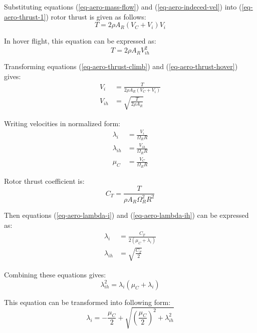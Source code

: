 Substituting equations (\ref{eq-aero-mass-flow}) and (\ref{eq-aero-indeced-vel}) into (\ref{eq-aero-thrust-1}) rotor thrust is given as follows:
\begin{equation}
  \label{eq-aero-thrust-climb}
  T = 2 \rho A_R \left( V_C + V_i \right) V_i
\end{equation}

In hover flight, this equation can be expressed as:
\begin{equation}
  \label{eq-aero-thrust-hover}
  T = 2 \rho A_R V_{ih}^2
\end{equation}

Transforming equations (\ref{eq-aero-thrust-climb}) and (\ref{eq-aero-thrust-hover}) gives:
\begin{align}
  V_i    &= \frac{T}{ 2 \rho A_R \left( V_C + V_i \right) } \\
  V_{ih} &= \sqrt{ \frac{T}{ 2 \rho A_R } }
\end{align}

Writing velocities in normalized form:
\begin{align}
  \label{eq-aero-lambda-i}
  \lambda_i    &= \frac{ V_i }    { \Omega_R R } \\
  \label{eq-aero-lambda-ih}
  \lambda_{ih} &= \frac{ V_{ih} } { \Omega_R R } \\
  \mu_C        &= \frac{ V_C }    { \Omega_R R }
\end{align}

Rotor thrust coefficient is:
\begin{equation}
  \label{eq-aero-thrust-coef}
  C_T = \frac{ T }{ \rho A_R \Omega_R^2 R^2 }
\end{equation}

Then equations (\ref{eq-aero-lambda-i}) and (\ref{eq-aero-lambda-ih}) can be expressed as:
\begin{align}
  \lambda_i    &= \frac{ C_T }{ 2 \left( \mu_C + \lambda_i \right) } \\
  \lambda_{ih} &= \sqrt{ \frac{ C_T }{ 2 } }
\end{align}

Combining these equations gives:
\begin{equation}
  \lambda_{ih}^2 = \lambda_i \left( \mu_C + \lambda_i \right)
\end{equation}

This equation can be transformed into following form:
\begin{equation}
  \label{eq-aero-lambda-i-2}
  \lambda_i
  =
  - \frac{\mu_C}{2}
  +
  \sqrt{ \left( \frac{\mu_C}{2} \right)^2 + \lambda_{ih}^2 }
\end{equation}

